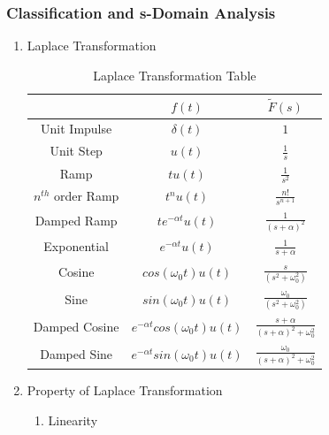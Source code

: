 \subsubsection{Classification and s-Domain Analysis}
\begin{enumerate}
    \item Laplace Transformation
        \begin{table}[h]
            \setlength{\arrayrulewidth}{0.3mm}
            \renewcommand{\arraystretch}{1.93}
            \centering
            \begin{tabular}{|c|c|c|}
            \hline
               & $f(t)$ & $\tilde{F}(s)$ \\
            \hline
            Unit Impulse & $\delta(t)$ & $1$ \\
            \hline
            Unit Step & $u(t)$ & $\displaystyle\frac{1}{s}$ \\
            \hline
            Ramp & $tu(t)$ & $\displaystyle \frac{1}{s^2}$ \\
            \hline
            $n^{th}$ order Ramp & $t^nu(t)$ & $\displaystyle \frac{n!}{s^{n+1}}$ \\
            \hline
            Damped Ramp & $\displaystyle te^{-\alpha t}u(t)$ & $\displaystyle \frac{1}{(s+\alpha)^2}$ \\
            \hline
            Exponential & $\displaystyle e^{-\alpha t}u(t)$ & $\displaystyle\frac{1}{s+\alpha}$ \\
            \hline
            Cosine & $cos(\omega_0t)u(t)$ & $\displaystyle \frac{s}{(s^2+\omega_0^2)}$\\
            \hline
            Sine & $sin(\omega_0t)u(t)$ & $\displaystyle \frac{\omega_0}{(s^2+\omega_0^2)}$\\
            \hline
            Damped Cosine & $\displaystyle e^{-\alpha t}cos(\omega_0t)u(t)$ & $\displaystyle \frac{s+\alpha}{(s+\alpha)^2+\omega_0^2}$ \\
            \hline
            Damped Sine & $\displaystyle e^{-\alpha t}sin(\omega_0t)u(t)$ & $\displaystyle \frac{\omega_0}{(s+\alpha)^2+\omega_0^2}$\\
            \hline
            \end{tabular}
            \caption{Laplace Transformation Table}
            \label{tab:my_label}
        \end{table}
    \item Property of Laplace Transformation
    \begin{enumerate}
        \item Linearity

\end{enumerate}
\end{enumerate}
